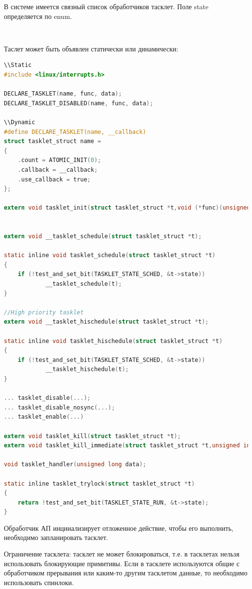 \documentclass[12pt,a4paper]{scrreprt}
\begin{document}
В системе имеется связный список обработчиков тасклет. Поле state определяется по enum.

~

Таслет может быть объявлен статически или динамически:

\begin{lstlisting}[language=C]
\\Static
#include <linux/interrupts.h>

DECLARE_TASKLET(name, func, data);
DECLARE_TASKLET_DISABLED(name, func, data);

\\Dynamic
#define DECLARE_TASKLET(name, __callback)
struct tasklet_struct name = 
{
	.count = ATOMIC_INIT(0);
	.callback = __callback;
	.use_callback = true;
};

extern void tasklet_init(struct tasklet_struct *t,void (*func)(unsigned long), 
																												unsigned long data);

extern void __tasklet_schedule(struct tasklet_struct *t);

static inline void tasklet_schedule(struct tasklet_struct *t)
{
	if (!test_and_set_bit(TASKLET_STATE_SCHED, &t->state))
			__tasklet_schedule(t);
}

//High priority tasklet
extern void __tasklet_hischedule(struct tasklet_struct *t);

static inline void tasklet_hischedule(struct tasklet_struct *t)
{
	if (!test_and_set_bit(TASKLET_STATE_SCHED, &t->state))
			__tasklet_hischedule(t);
}

... tasklet_disable(...);
... tasklet_disable_nosync(...);
... tasklet_enable(...)

extern void tasklet_kill(struct tasklet_struct *t);
extern void tasklet_kill_immediate(struct tasklet_struct *t,unsigned int cpu);

void tasklet_handler(unsigned long data);

static inline tasklet_trylock(struct tasklet_struct *t)
{
	return !test_and_set_bit(TASKLET_STATE_RUN, &t->state);
}
\end{lstlisting}

Обработчик АП инцииализирует отложенное действие, чтобы его выполнить, необходимо запланировать тасклет.

Ограничение тасклета: тасклет не может блокироваться, т.е. в тасклетах нельзя использовать блокирующие примитивы. Если в тасклете используются общие с обработчиком прерывания или каким-то другим тасклетом данные, то необходимо использовать спинлоки. 
\end{document}

